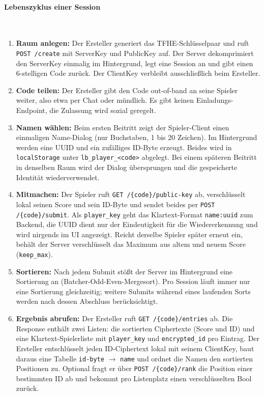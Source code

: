 \paragraph{Lebenszyklus einer Session}\mbox{}\\
\begin{enumerate}
    \item \textbf{Raum anlegen:} Der Ersteller generiert das TFHE-Schlüsselpaar und ruft \texttt{POST /create} mit ServerKey und PublicKey auf. Der Server dekomprimiert den ServerKey einmalig im Hintergrund, legt eine Session an und gibt einen 6-stelligen Code zurück. Der ClientKey verbleibt ausschließlich beim Ersteller.
    \item \textbf{Code teilen:} Der Ersteller gibt den Code out-of-band an seine Spieler weiter, also etwa per Chat oder mündlich. Es gibt keinen Einladungs-Endpoint, die Zulassung wird sozial geregelt.
    \item \textbf{Namen wählen:} Beim ersten Beitritt zeigt der Spieler-Client einen einmaligen Name-Dialog (nur Buchstaben, 1 bis 20 Zeichen). Im Hintergrund werden eine UUID und ein zufälliges ID-Byte erzeugt. Beides wird in \texttt{localStorage} unter \texttt{lb\_player\_<code>} abgelegt. Bei einem späteren Beitritt in denselben Raum wird der Dialog übersprungen und die gespeicherte Identität wiederverwendet.
    \item \textbf{Mitmachen:} Der Spieler ruft \texttt{GET /\{code\}/public-key} ab, verschlüsselt lokal seinen Score und sein ID-Byte und sendet beides per \texttt{POST /\{code\}/submit}. Als \texttt{player\_key} geht das Klartext-Format \texttt{name:uuid} zum Backend, die UUID dient nur der Eindeutigkeit für die Wiedererkennung und wird nirgends im UI angezeigt. Reicht derselbe Spieler später erneut ein, behält der Server verschlüsselt das Maximum aus altem und neuem Score (\texttt{keep\_max}).
    \item \textbf{Sortieren:} Nach jedem Submit stößt der Server im Hintergrund eine Sortierung an (Batcher-Odd-Even-Mergesort). Pro Session läuft immer nur eine Sortierung gleichzeitig; weitere Submits während eines laufenden Sorts werden nach dessen Abschluss berücksichtigt.
    \item \textbf{Ergebnis abrufen:} Der Ersteller ruft \texttt{GET /\{code\}/entries} ab. Die Response enthält zwei Listen: die sortierten Ciphertexte (Score und ID) und eine Klartext-Spielerliste mit \texttt{player\_key} und \texttt{encrypted\_id} pro Eintrag. Der Ersteller entschlüsselt jeden ID-Ciphertext lokal mit seinem ClientKey, baut daraus eine Tabelle \texttt{id-byte} $\rightarrow$ \texttt{name} und ordnet die Namen den sortierten Positionen zu. Optional fragt er über \texttt{POST /\{code\}/rank} die Position einer bestimmten ID ab und bekommt pro Listenplatz einen verschlüsselten Bool zurück.

\end{enumerate}

